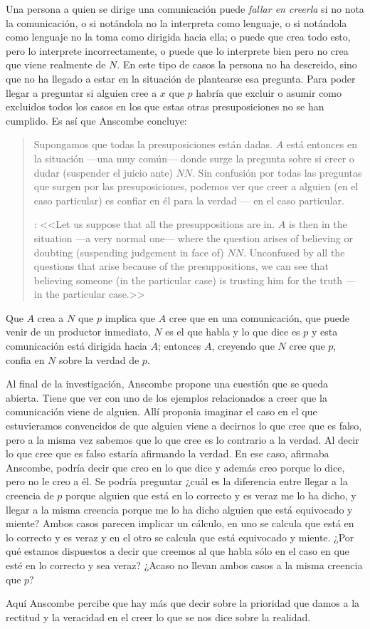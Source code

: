 Una persona a quien se dirige una comunicación puede \emph{fallar en creerla} si no nota la comunicación, o si notándola no la interpreta como lenguaje, o si notándola como lenguaje no la toma como dirigida hacia ella; o puede que crea todo esto, pero lo interprete incorrectamente, o puede que lo interprete bien pero no crea que viene realmente de $N$. En este tipo de casos la persona no ha descreido, sino que no ha llegado a estar en la situación de plantearse esa pregunta. Para poder llegar a preguntar si alguien cree a $x$ que $p$ habría que excluir o asumir como excluidos todos los casos en los que estas otras presuposiciones no se han cumplido. Es así que Anscombe concluye: \blockquote[{\cite[9]{anscombe2008faith:tobelieve}}: <<Let us suppose that all the presuppositions are in. $A$ is then in the situation ---a very normal one--- where the question arises of believing or doubting (suspending judgement in face of) $NN$. Unconfused by all the questions that arise because of the presuppositions, we can see that believing someone (in the particular case) is trusting him for the truth --- in the particular case.>>]{Supongamos que todas la presuposiciones están dadas. $A$ está entonces en la situación ---una muy común--- donde surge la pregunta sobre si creer o dudar (suspender el juicio ante) $NN$. Sin confusión por todas las preguntas que surgen por las presuposiciones, podemos ver que creer a alguien (en el caso particular) es confiar en él para la verdad --- en el caso particular.} Que $A$ crea a $N$ que $p$ implica que $A$ cree que en una comunicación, que puede venir de un productor inmediato, $N$ es el que habla y lo que dice es $p$ y esta comunicación está dirigida hacia $A$; entonces $A$, creyendo que $N$ cree que $p$, confia en $N$ sobre la verdad de $p$.

Al final de la investigación, Anscombe propone una cuestión que se queda
abierta. Tiene que ver con uno de los ejemplos relacionados a creer que la
comunicación viene de alguien. Allí proponia imaginar el caso en el que
estuvieramos convencidos de que alguien viene a decirnos lo que cree que es
falso, pero a la misma vez sabemos que lo que cree es lo contrario a la verdad.
Al decir lo que cree que es falso estaría afirmando la verdad. En ese caso,
afirmaba Anscombe, podría decir que creo en lo que dice y además creo porque lo
dice, pero no le creo a él. Se podría preguntar ¿cuál es la diferencia entre
llegar a la creencia de $p$ porque alguien que está en lo correcto y es veraz me
lo ha dicho, y llegar a la misma creencia porque me lo ha dicho alguien que está
equivocado y miente? Ambos casos parecen implicar un cálculo, en uno se calcula
que está en lo correcto y es veraz y en el otro se calcula que está equivocado y
miente. ¿Por qué estamos dispuestos a decir que creemos al que habla sólo en el
caso en que esté en lo correcto y sea veraz? ¿Acaso no llevan ambos casos a la
misma creencia que $p$?

Aquí Anscombe percibe que hay más que decir sobre la prioridad que damos a la
rectitud y la veracidad en el creer lo que se nos dice sobre la realidad.
